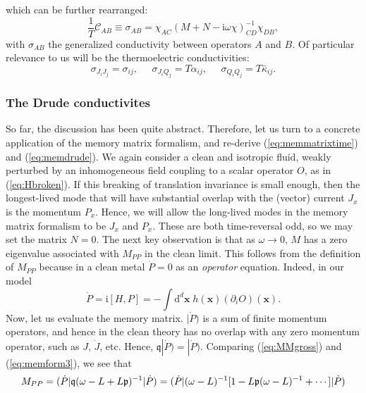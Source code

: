 \documentclass[10pt, oneside]{book}
\begin{document}
\begin{doublespace}
\begin{equation}
\end{equation}
which can be further rearranged: \begin{equation}
\frac{1}{T}\mathcal{C}_{AB} \equiv \sigma_{AB} = \chi_{AC}(M+N-\mathrm{i}\omega \chi)^{-1}_{CD}\chi_{DB}, \label{eq:memmatrixgeneral}
\end{equation}
with $\sigma_{AB}$ the generalized conductivity between operators $A$ and $B$.   
Of particular relevance to us will be the thermoelectric conductivities:  \begin{equation}
\sigma_{J_i J_j} = \sigma_{ij}, \;\;\;\;\; \sigma_{J_iQ_j} = T\alpha_{ij}, \;\;\;\;\; \sigma_{Q_iQ_j} = T\bar\kappa_{ij}.
\end{equation}

\subsubsection{The Drude conductivites}
So far, the discussion has been quite abstract.   Therefore, let us turn to a concrete application of the memory matrix formalism, and re-derive (\ref{eq:memmatrixtime}) and (\ref{eq:memdrude}).   We again consider a clean and isotropic fluid,  weakly perturbed by an inhomogeneous field coupling to a scalar operator $O$, as in (\ref{eq:Hbroken}).   If this breaking of translation invariance is small enough,  then the longest-lived mode that will have substantial overlap with the (vector) current $J_x$ is the momentum $P_x$.   Hence, we will allow the long-lived modes in the memory matrix formalism to be $J_x$ and $P_x$.     These are both time-reversal odd, so we may set the matrix $N=0$.    The next key observation is that as $\omega \rightarrow 0$,  $M$ has a zero eigenvalue associated with $M_{PP}$ in the clean limit.   This follows from the definition of $M_{PP}$ because in a clean metal $\dot{P}=0$ as an \emph{operator} equation.   Indeed, in our model \begin{equation}
\dot{P}  = \mathrm{i}[H,P] = -\int\mathrm{d}^d\mathbf{x}\; h(\mathbf{x}) (\partial_i O)(\mathbf{x}).
\end{equation}
Now, let us evaluate the memory matrix.   $|\dot{P})$ is a sum of finite momentum operators, and hence in the clean theory has no overlap with any zero momentum operator, such as $J$, $\dot{J}$, etc.   Hence,  $\mathfrak{q}|\dot{P}) = |\dot{P})$.   Comparing (\ref{eq:MMgross}) and (\ref{eq:memform3}), we see that \begin{align}
M_{PP} &= (\dot{P}| \mathfrak{q} (\omega-L+L\mathfrak{p})^{-1}|\dot{P}) = (\dot{P}| (\omega-L)^{-1}[1 - L\mathfrak{p}(\omega-L)^{-1}+\cdots] |\dot{P}) \notag \\

\end{align}
\end{doublespace}
\end{document}

